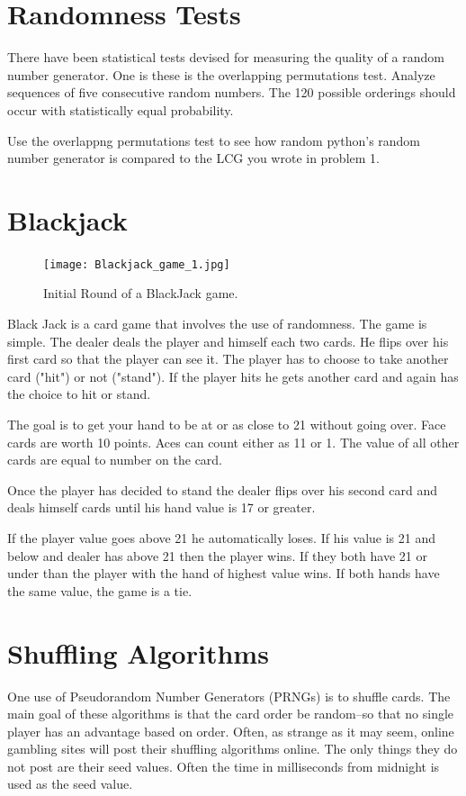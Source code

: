 \section*{Randomness Tests}
There have been statistical tests devised for measuring the quality of a random number generator. One is these is the overlapping permutations test. Analyze sequences of five consecutive random numbers. The 120 possible orderings should occur with statistically equal probability.

\begin{problem}
Use the overlappng permutations test to see how random python's random number generator is compared to the LCG you wrote in problem 1.
\end{problem}

\section*{Blackjack}
\begin{figure}
\texttt{[image: Blackjack\_game\_1.jpg]}
\caption{Initial Round of a BlackJack game.}
\end{figure}

Black Jack is a card game that involves the use of randomness.
The game is simple.
The dealer deals the player and himself each two cards.
He flips over his first card so that the player can see it.
The player has to choose to take another card ("hit") or not ("stand").
If the player hits he gets another card and again has the choice to hit or stand.

The goal is to get your hand to be at or as close to 21 without going over.
Face cards are worth 10 points.
Aces can count either as 11 or 1.
The value of all other cards are equal to number on the card.

Once the player has decided to stand the dealer flips over his second card and deals himself cards until his hand value is 17 or greater. 

If the player value goes above 21 he automatically loses.
If his value is 21 and below and dealer has above 21 then the player wins.
If they both have 21 or under than the player with the hand of highest value wins.
If both hands have the same value, the game is a tie.

\section*{Shuffling Algorithms}
One use of Pseudorandom Number Generators (PRNGs) is to shuffle cards.
The main goal of these algorithms is that the card order be random--so that no single player has an advantage based on order.
Often, as strange as it may seem, online gambling sites will post their shuffling algorithms online.
The only things they do not post are their seed values.
Often the time in milliseconds from midnight is used as the seed value.


